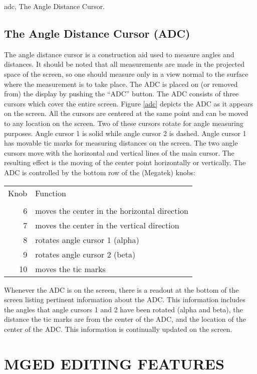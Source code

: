 \mfig adc, The Angle Distance Cursor.
\section{The Angle Distance Cursor (ADC)}

The angle distance cursor is a construction aid used to measure
angles and distances. It should be noted that all measurements are
made in the projected space of the screen, so one should measure only
in a view normal to the surface where the measurement is to take place.
The ADC is placed on (or removed from) the display by pushing the ``ADC''
button.
The ADC consists of three cursors which cover the entire screen.
Figure \ref{adc} depicts the ADC as it appears on the screen.
All the cursors are centered at the same point and can be moved to any
location on the screen.  Two of these cursors rotate for angle measuring
purposes. Angle cursor 1 is solid while angle cursor 2 is dashed.  Angle
cursor 1 has movable tic marks for measuring distances on the screen.
The two angle cursors move with the horizontal and vertical
lines of the main cursor.
The resulting effect is the moving of the center point
horizontally or vertically.
The ADC is controlled by the bottom row
of the (Megatek) knobs:

\begin{tabular}{rl}
Knob  & Function \\
 \\
6     & moves the center in the horizontal direction \\
7     & moves the center in the vertical direction \\
8     & rotates angle cursor 1  (alpha) \\
9     & rotates angle cursor 2  (beta) \\
10    & moves the tic marks
\end{tabular}

Whenever the ADC is on the screen, there is a readout at the bottom of
the screen listing pertinent information about the ADC.
This information includes the angles that angle cursors 1 and 2
have been rotated (alpha and beta), the distance the tic marks are
from the center of the ADC, and the location of the center of the ADC.
This information is continually updated on the screen.

\chapter{MGED EDITING FEATURES}

